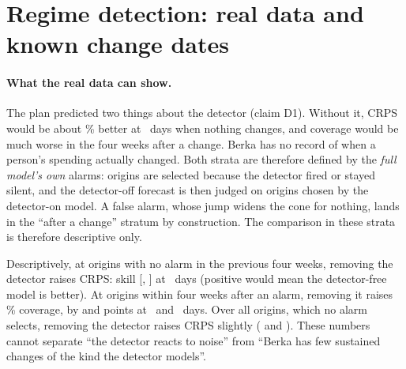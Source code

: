 \section{Regime detection: real data and known change dates}
\label{sec:regime}\label{app:regime}

\paragraph{What the real data can show.} The plan predicted two things
about the detector (claim D1). Without it, CRPS would be about
\% better at \hC\ days when nothing changes, and
coverage would be much worse in the four weeks after a change. Berka has
no record of when a person's spending actually changed. Both strata are
therefore defined by the \emph{full model's own} alarms: origins are
selected because the detector fired or stayed silent, and the
detector-off forecast is then judged on origins chosen by the detector-on
model. A false alarm, whose jump widens the cone for nothing, lands in the
``after a change'' stratum by construction. The comparison in these
strata is therefore descriptive only.

Descriptively, at origins with no alarm in the previous four weeks,
removing the detector raises CRPS: skill
[,
] at \hC\ days
(positive would mean the detector-free model is better). At origins within
four weeks after an alarm, removing it raises \lC\% coverage, by
 and
points at \hB\ and \hC\ days. Over all origins, which no alarm selects,
removing the detector raises CRPS slightly
( and
). These numbers cannot
separate ``the detector reacts to noise'' from ``Berka has few sustained
changes of the kind the detector models''.

